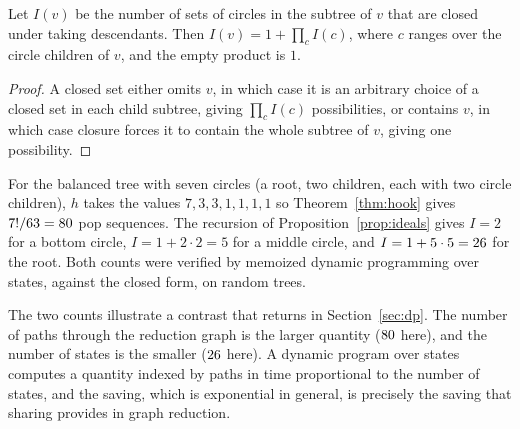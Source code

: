 \begin{proposition}\label{prop:ideals}
Let $I(v)$ be the number of sets of circles in the subtree of $v$ that are closed under taking descendants. Then $I(v)=1+\prod_{c}I(c)$, where $c$ ranges over the circle children of $v$, and the empty product is $1$.
\end{proposition}

\begin{proof}
A closed set either omits $v$, in which case it is an arbitrary choice of a closed set in each child subtree, giving $\prod_c I(c)$ possibilities, or contains $v$, in which case closure forces it to contain the whole subtree of $v$, giving one possibility.
\end{proof}

\begin{example}
For the balanced tree with seven circles (a root, two children, each with two circle children), $h$ takes the values $7,3,3,1,1,1,1$ so Theorem~\ref{thm:hook} gives $7!/63=80$ pop sequences. The recursion of Proposition~\ref{prop:ideals} gives $I=2$ for a bottom circle, $I=1+2\cdot 2=5$ for a middle circle, and $I=1+5\cdot 5=26$ for the root. Both counts were verified by memoized dynamic programming over states, against the closed form, on \factPureTrees{} random trees.
\end{example}

The two counts illustrate a contrast that returns in Section~\ref{sec:dp}. The number of paths through the reduction graph is the larger quantity ($80$ here), and the number of states is the smaller ($26$ here). A dynamic program over states computes a quantity indexed by paths in time proportional to the number of states, and the saving, which is exponential in general, is precisely the saving that sharing provides in graph reduction.
